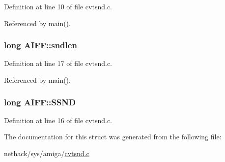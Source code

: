 Definition at line 10 of file cvtsnd.\+c.



Referenced by main().

\hypertarget{structAIFF_a8f1cede21c2276515408d7f1a396095c}{
\subsubsection[{sndlen}]{\setlength{\rightskip}{0pt plus 5cm}long A\+I\+F\+F\+::sndlen}}\label{structAIFF_a8f1cede21c2276515408d7f1a396095c}


Definition at line 17 of file cvtsnd.\+c.



Referenced by main().

\hypertarget{structAIFF_a9c582bb0f3a805186275c4ac14e46da9}{
\subsubsection[{S\+S\+N\+D}]{\setlength{\rightskip}{0pt plus 5cm}long A\+I\+F\+F\+::\+S\+S\+N\+D}}\label{structAIFF_a9c582bb0f3a805186275c4ac14e46da9}


Definition at line 16 of file cvtsnd.\+c.



The documentation for this struct was generated from the following file\+:\begin{DoxyCompactItemize}
\item 
nethack/sys/amiga/\hyperlink{cvtsnd_8c}{cvtsnd.\+c}\end{DoxyCompactItemize}
